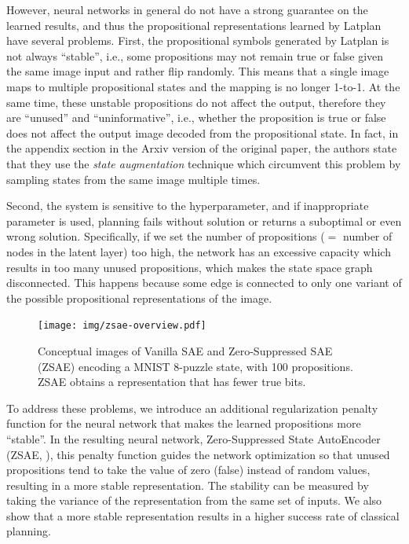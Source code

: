 However,
neural networks in general do not have a strong guarantee on the learned results,
and thus the propositional representations learned by Latplan have several problems.
First, the propositional symbols generated by Latplan is not always
``stable'', i.e., some propositions may not remain true or false given the same image input
and rather flip randomly.
This means that a single image maps to multiple propositional states and the mapping is
no longer 1-to-1.
% 
At the same time, these unstable propositions do not affect the output, therefore they are
``unused'' and ``uninformative'', i.e.,
whether the proposition is true or false does not affect the output image decoded from the propositional state.
In fact, in the appendix section in the Arxiv version of the original paper,
the authors state that they use the \emph{state augmentation} technique
which circumvent this problem by sampling states from the same image multiple times.

Second, the system is sensitive to the hyperparameter, and if inappropriate parameter
is used, planning fails without solution or returns a suboptimal or even wrong solution.
Specifically, if we set the number of propositions ($=$ number of nodes in the latent layer) too high, the network
has an excessive capacity which results in too many unused propositions,
which makes the state space graph disconnected.
This happens because some edge is connected to only one variant of
the possible propositional representations of the image.

\begin{figure}[htb]
 \centering
 \texttt{[image: img/zsae-overview.pdf]}
 \caption{
Conceptual images of Vanilla SAE and Zero-Suppressed SAE (ZSAE) encoding a MNIST 8-puzzle state, with 100 propositions.
ZSAE obtains a representation that has fewer true bits.}
 \label{zsae-overview}
\end{figure}

To address these problems,
we introduce an additional regularization penalty function for the neural network 
that makes the learned propositions more ``stable''. In the resulting neural network,
Zero-Suppressed State AutoEncoder (ZSAE, ), this penalty function
guides the network optimization so that unused propositions tend to 
take the value of zero (false) instead of random values,
resulting in a more stable representation.
The stability can be measured by taking the variance of the representation from the same set of inputs.
We also show that a more stable representation results in a higher success rate of classical planning.

